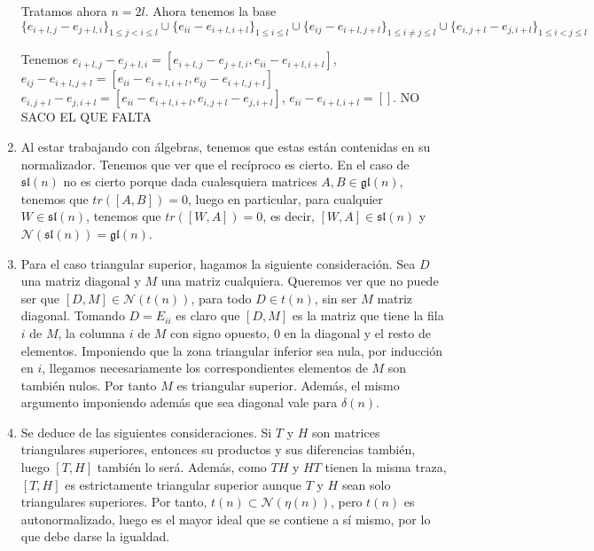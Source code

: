 \documentclass[twoside]{article}
\begin{document}
\begin{solucion}
\begin{enumerate}
Tratamos ahora $n=2l$. Ahora tenemos la base
\[
\{e_{i+l,j}-e_{j+l,i}\}_{1\leq j<i\leq l}\cup\{e_{ii}-e_{i+l,i+l}\}_{1\leq i\leq l}\cup\{e_{ij}-e_{i+l,j+l}\}_{1\leq i\neq j\leq l}\cup\{e_{i,j+l}-e_{j,i+l}\}_{1\leq i<j\leq l}
\]

	Tenemos $e_{i+l,j}-e_{j+l,i}=[e_{i+l,j}-e_{j+l,i},e_{ii}-e_{i+l,i+l}]$, $e_{ij}-e_{i+l,j+l}=[e_{ii}-e_{i+l,i+l},e_{ij}-e_{i+l,j+l}]$ $e_{i,j+l}-e_{j,i+l}=[e_{ii}-e_{i+l,i+l},e_{i,j+l}-e_{j,i+l}]$, $e_{ii}-e_{i+l,i+l}=[]$. NO SACO EL QUE FALTA

\item Al estar trabajando con álgebras, tenemos que estas están contenidas en su normalizador. Tenemos que ver que el recíproco es cierto. En el caso de $\mathfrak{sl}(n)$ no es cierto porque dada cualesquiera matrices $A,B\in\mathfrak{gl}(n)$, tenemos que $tr([A,B])=0$, luego en particular, para cualquier $W\in \mathfrak{sl}(n)$, tenemos que $tr([W,A])=0$, es decir, $[W,A]\in\mathfrak{sl}(n)$ y $\mathcal{N}(\mathfrak{sl}(n))=\mathfrak{gl}(n)$. %

\item 
Para el caso triangular superior, hagamos la siguiente consideración. Sea $D$ una matriz diagonal y $M$ una matriz cualquiera. Queremos ver que no puede ser que $[D,M] \in \mathcal{N}(t(n))$, para todo $D\in t(n)$, sin ser $M$ matriz diagonal. Tomando $D=E_{ii}$ es claro que $[D,M]$ es la matriz que tiene la fila $i$ de $M$, la columna $i$ de $M$ con signo opuesto, $0$ en la diagonal y el resto de elementos. Imponiendo que la zona triangular inferior sea nula, por inducción en $i$, llegamos  necesariamente los correspondientes elementos de $M$ son también nulos. Por tanto $M$ es triangular superior. Además, el mismo argumento imponiendo además que sea diagonal vale para $\delta(n)$.

\item Se deduce de las siguientes consideraciones. Si $T$ y $H$ son matrices triangulares superiores, entonces su productos y sus diferencias también, luego $[T,H]$ también lo será. Además, como $TH$ y $HT$ tienen la misma traza, $[T,H]$ es estrictamente triangular superior aunque $T$ y $H$ sean solo triangulares superiores. Por tanto, $t(n) \subset \mathcal{N}(\eta(n))$, pero $t(n)$ es autonormalizado, luego es el mayor ideal que se contiene a sí mismo, por lo que debe darse la igualdad. 
\end{enumerate}
\end{solucion}
\end{document}
